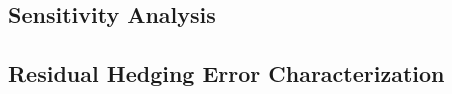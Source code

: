 
\subsection{Sensitivity Analysis}
\label{subsec:sensitivity}


\subsection{Residual Hedging Error Characterization}
\label{subsec:residual_error}

